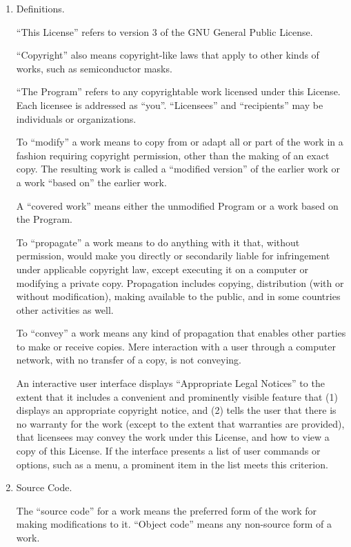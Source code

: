 \documentclass[12pt,a4paper]{book}
\begin{document}
\begin{enumerate}

\addtocounter{enumi}{-1}

\item Definitions.

``This License'' refers to version 3 of the GNU General Public License.

``Copyright'' also means copyright-like laws that apply to other kinds of
works, such as semiconductor masks.

``The Program'' refers to any copyrightable work licensed under this
License.  Each licensee is addressed as ``you''.  ``Licensees'' and
``recipients'' may be individuals or organizations.

To ``modify'' a work means to copy from or adapt all or part of the work
in a fashion requiring copyright permission, other than the making of an
exact copy.  The resulting work is called a ``modified version'' of the
earlier work or a work ``based on'' the earlier work.

A ``covered work'' means either the unmodified Program or a work based
on the Program.

To ``propagate'' a work means to do anything with it that, without
permission, would make you directly or secondarily liable for
infringement under applicable copyright law, except executing it on a
computer or modifying a private copy.  Propagation includes copying,
distribution (with or without modification), making available to the
public, and in some countries other activities as well.

To ``convey'' a work means any kind of propagation that enables other
parties to make or receive copies.  Mere interaction with a user through
a computer network, with no transfer of a copy, is not conveying.

An interactive user interface displays ``Appropriate Legal Notices''
to the extent that it includes a convenient and prominently visible
feature that (1) displays an appropriate copyright notice, and (2)
tells the user that there is no warranty for the work (except to the
extent that warranties are provided), that licensees may convey the
work under this License, and how to view a copy of this License.  If
the interface presents a list of user commands or options, such as a
menu, a prominent item in the list meets this criterion.

\item Source Code.

The ``source code'' for a work means the preferred form of the work
for making modifications to it.  ``Object code'' means any non-source
form of a work.


\end{enumerate}
\end{document}
